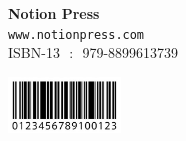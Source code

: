 \documentclass{article}
\begin{document}
\begin{center}
\textbf{Notion Press}\\
\texttt{www.notionpress.com}\\
ISBN-13 ‏ : ‎ 979-8899613739
\end{center}

\begin{center}
\includegraphics[width=3cm]{isbn_barcode}
\end{center}
\end{document}

